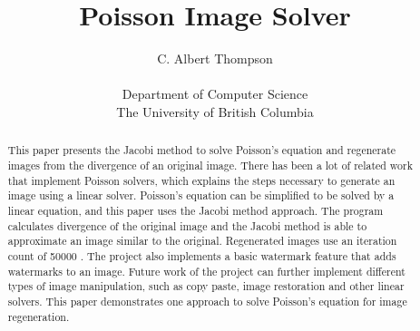 \documentclass[10pt,twopage]{acmsiggraph}
\begin{document}
\newcommand\result{0.01\%}
\newcommand\iteration{50000 }

%
%

\title{Poisson Image Solver}

\newcommand\name{C. Albert Thompson}

\author{\name\\
\\
Department of Computer Science\\
The University of British Columbia}

\maketitle

%
%

\begin{abstract}
This paper presents the Jacobi method to solve Poisson's equation and regenerate images from the divergence of an original image. There has been a lot of related work that implement Poisson solvers, which explains the steps necessary to generate an image using a linear solver. Poisson's equation can be simplified to be solved by a linear equation, and this paper uses the Jacobi method approach. The program calculates divergence of the original image and the Jacobi method is able to approximate an image similar to the original.  Regenerated images use an iteration count of \iteration. The project also implements a basic watermark feature that adds watermarks to an image. Future work of the project can further implement different types of image manipulation, such as copy paste, image restoration and other linear solvers. This paper demonstrates one approach to solve Poisson's equation for image regeneration.
\end{abstract}

%
%
\end{document}
